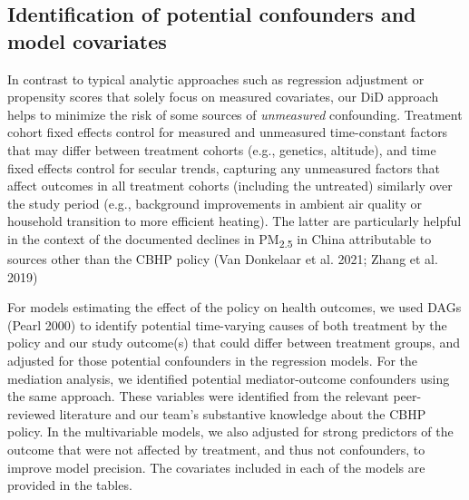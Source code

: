 \documentclass[
  letterpaper,
  DIV=11,
  numbers=noendperiod]{scrartcl}
\begin{document}
\hypertarget{identification-of-potential-confounders-and-model-covariates}{%
\subsection{Identification of potential confounders and model
covariates}\label{identification-of-potential-confounders-and-model-covariates}}

In contrast to typical analytic approaches such as regression adjustment
or propensity scores that solely focus on measured covariates, our DiD
approach helps to minimize the risk of some sources of \emph{unmeasured}
confounding. Treatment cohort fixed effects control for measured and
unmeasured time-constant factors that may differ between treatment
cohorts (e.g., genetics, altitude), and time fixed effects control for
secular trends, capturing any unmeasured factors that affect outcomes in
all treatment cohorts (including the untreated) similarly over the study
period (e.g., background improvements in ambient air quality or
household transition to more efficient heating). The latter are
particularly helpful in the context of the documented declines in
PM\textsubscript{2.5} in China attributable to sources other than the
CBHP policy (Van Donkelaar et al. 2021; Zhang et al. 2019)

For models estimating the effect of the policy on health outcomes, we
used DAGs (Pearl 2000) to identify potential time-varying causes of both
treatment by the policy and our study outcome(s) that could differ
between treatment groups, and adjusted for those potential confounders
in the regression models. For the mediation analysis, we identified
potential mediator-outcome confounders using the same approach. These
variables were identified from the relevant peer-reviewed literature and
our team's substantive knowledge about the CBHP policy. In the
multivariable models, we also adjusted for strong predictors of the
outcome that were not affected by treatment, and thus not confounders,
to improve model precision. The covariates included in each of the
models are provided in the tables.
\end{document}
